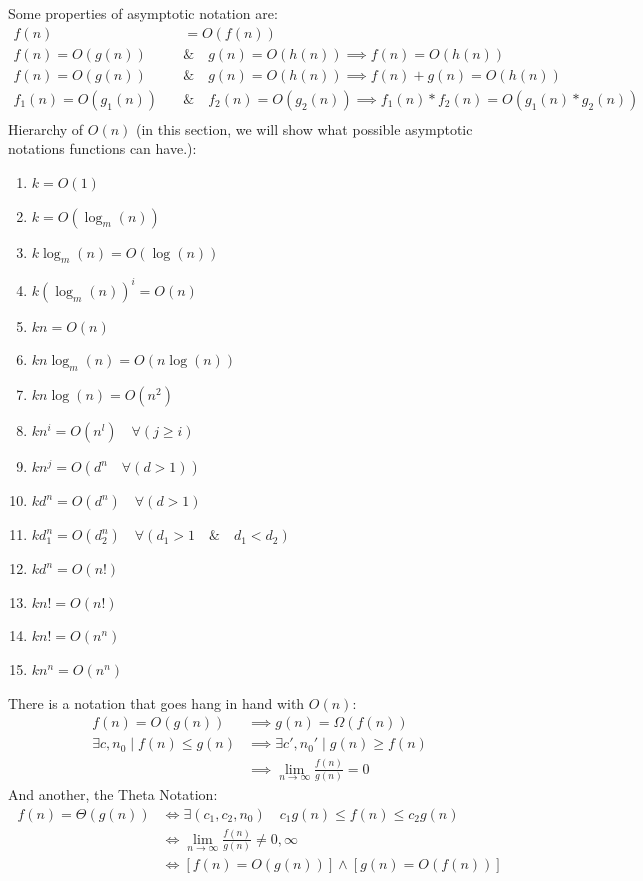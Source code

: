 \documentclass[nobib]{tufte-handout}
\begin{document}
Some properties of asymptotic notation are:
\begin{align*}
    f(n)&=O(f(n))\\
    f(n)=O(g(n))\quad &\& \quad g(n) = O(h(n)) \implies f(n)=O(h(n))\\
    f(n)=O(g(n))\quad &\& \quad g(n) = O(h(n)) \implies f(n)+g(n)=O(h(n))\\
    f_1(n)=O(g_1(n))\quad &\& \quad f_2(n) = O(g_2(n)) \implies f_1(n)*f_2(n)=O(g_1(n)*g_2(n))\\
\end{align*}
Hierarchy of $O(n)$ (in this section, we will show what possible asymptotic notations functions can have.):\\
\begin{enumerate}
    \item $k=O(1)$
    \item $k=O(\log_m(n))$
    \item $k\log_m(n)=O(\log(n))$
    \item $k{(\log_m(n))}^i=O(n)$
    \item $kn=O(n)$
    \item $kn\log_m(n)=O(n\log(n))$
    \item $kn\log(n)=O(n^2)$
    \item $kn^i=O(n^l) \quad \forall (j\geq i)$
    \item $kn^j=O(d^n \quad \forall(d>1))$
    \item $kd^n=O(d^n)\quad \forall (d>1)$
    \item $kd_1^n=O(d_2^n) \quad \forall(d_1>1\quad \&\quad d_1<d_2)$
    \item $kd^n = O(n!)$
    \item $kn!=O(n!)$
    \item $kn!=O(n^n)$
    \item $kn^n=O(n^n)$
\end{enumerate}
There is a notation that goes hang in hand with $O(n)$:
\begin{align*}
    f(n)=O(g(n))&\implies g(n)=\Omega(f(n))\\
    \exists c, n_0 \mid f(n)\leq g(n) & \implies \exists c', n_0' \mid g(n)\geq f(n)\\
    &\implies \lim_{n\rightarrow\infty}\frac{f(n)}{g(n)}=0
\end{align*}
And another, the Theta Notation:
\begin{align*}
    f(n)=\Theta(g(n)) &\iff \exists(c_1,c_2,n_0)\quad c_1g(n)\leq f(n)\leq c_2g(n)\\
    &\iff \lim_{n\rightarrow\infty}\frac{f(n)}{g(n)}\neq 0,\infty\\
    &\iff [f(n) = O(g(n))] \land [g(n) = O(f(n))]
\end{align*}
\end{document}
